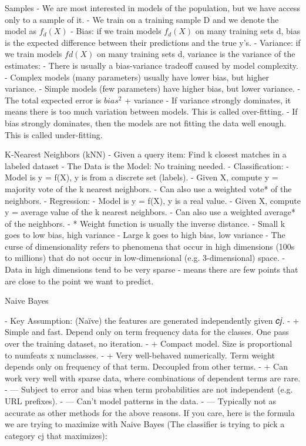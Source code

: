 \documentclass[3pt,landscape]{article}
\begin{document}
\begin{multicols}{3}
Samples
- We are most interested in models of the population, but we have access only to a sample of it.
- We train on a training sample D and we denote the model as $f_d(X)$ 
- Bias: if we train models $f_d(X)$ on many training sets d, bias is the expected difference between their predictions and the true y’s. 
- Variance: if we train models $fd(X)$ on many training sets d, variance is the variance of the estimates: 
- There is usually a bias-variance tradeoff caused by model complexity.
  - Complex models (many parameters) usually have lower bias, but higher variance.
  - Simple models (few parameters) have higher bias, but lower variance. 
- The total expected error is $bias^2$ + variance 
- If variance strongly dominates, it means there is too much variation between models. This is called over-fitting.
- If bias strongly dominates, then the models are not fitting the data well enough. This is called under-fitting.

K-Nearest Neighbors (kNN)
- Given a query item: Find k closest matches in a labeled dataset 
- The Data is the Model: No training needed. 
- Classification:
  - Model is y = f(X), y is from a discrete set (labels).
  - Given X, compute y = majority vote of the k nearest neighbors.
  - Can also use a weighted vote* of the neighbors.
- Regression:
  - Model is y = f(X), y is a real value.
  - Given X, compute y = average value of the k nearest neighbors.
  - Can also use a weighted average* of the neighbors.
- * Weight function is usually the inverse distance. 
- Small k goes to low bias, high variance
- Large k goes to high bias, low variance 
- The curse of dimensionality refers to phenomena that occur in high dimensions (100s to millions) that do not occur in low-dimensional (e.g. 3-dimensional) space. 
  - Data in high dimensions tend to be very sparse 
  - means there are few points that are close to the point we want to predict. 

Naive Bayes

-  Key Assumption: (Naïve) the features are generated independently given 𝑐𝑗. 
- + Simple and fast. Depend only on term frequency data for the classes. One pass over the training dataset, no iteration.
- + Compact model. Size is proportional to numfeats x numclasses.
- + Very well-behaved numerically. Term weight depends only on frequency of that term. Decoupled from other terms.
- + Can work very well with sparse data, where combinations of dependent terms are rare.
- — Subject to error and bias when term probabilities are not independent (e.g. URL prefixes).
- — Can’t model patterns in the data.
- — Typically not as accurate as other methods for the above reasons. 
If you care, here is the formula we are trying to maximize with Naive Bayes (The classifier is trying to pick a category cj that maximizes): 



\end{multicols}
\end{document}
